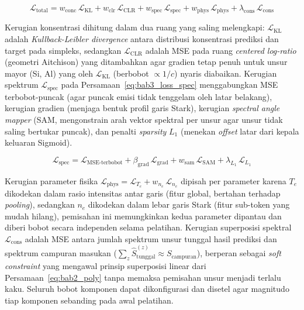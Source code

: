 \begin{enumerate}
\begin{equation} \label{eq:bab3_loss}
\mathcal{L}_{\mathrm{total}} = w_{\mathrm{conc}}\,\mathcal{L}_{\mathrm{KL}} + w_{\mathrm{clr}}\,\mathcal{L}_{\mathrm{CLR}} + w_{\mathrm{spec}}\,\mathcal{L}_{\mathrm{spec}} + w_{\mathrm{phys}}\,\mathcal{L}_{\mathrm{phys}} + \lambda_{\mathrm{cons}}\,\mathcal{L}_{\mathrm{cons}}
\end{equation}

    Kerugian konsentrasi dihitung dalam dua ruang yang saling melengkapi: $\mathcal{L}_{\mathrm{KL}}$ adalah \textit{Kullback-Leibler divergence} antara distribusi konsentrasi prediksi dan target pada simpleks, sedangkan $\mathcal{L}_{\mathrm{CLR}}$ adalah MSE pada ruang \textit{centered log-ratio} (geometri Aitchison) yang ditambahkan agar gradien tetap penuh untuk unsur mayor (Si, Al) yang oleh $\mathcal{L}_{\mathrm{KL}}$ (berbobot $\propto 1/c$) nyaris diabaikan. Kerugian spektrum $\mathcal{L}_{\mathrm{spec}}$ pada Persamaan~\ref{eq:bab3_loss_spec} menggabungkan MSE terbobot-puncak (agar puncak emisi tidak tenggelam oleh latar belakang), kerugian gradien (menjaga bentuk profil garis Stark), kerugian \textit{spectral angle mapper} (SAM, mengonstrain arah vektor spektral per unsur agar unsur tidak saling bertukar puncak), dan penalti \textit{sparsity} $L_1$ (menekan \textit{offset} latar dari kepala keluaran Sigmoid).

\begin{equation} \label{eq:bab3_loss_spec}
\mathcal{L}_{\mathrm{spec}} = \mathcal{L}_{\mathrm{MSE\text{-}terbobot}} + \beta_{\mathrm{grad}}\,\mathcal{L}_{\mathrm{grad}} + w_{\mathrm{sam}}\,\mathcal{L}_{\mathrm{SAM}} + \lambda_{L_1}\,\mathcal{L}_{L_1}
\end{equation}

    Kerugian parameter fisika $\mathcal{L}_{\mathrm{phys}} = \mathcal{L}_{T_e} + w_{n_e}\,\mathcal{L}_{n_e}$ dipisah per parameter karena $T_e$ dikodekan dalam rasio intensitas antar garis (fitur global, bertahan terhadap \textit{pooling}), sedangkan $n_e$ dikodekan dalam lebar garis Stark (fitur sub-token yang mudah hilang), pemisahan ini memungkinkan kedua parameter dipantau dan diberi bobot secara independen selama pelatihan. Kerugian superposisi spektral $\mathcal{L}_{\mathrm{cons}}$ adalah MSE antara jumlah spektrum unsur tunggal hasil prediksi dan spektrum campuran masukan ($\sum_z \hat{S}_{\mathrm{tunggal}}^{(z)} \approx S_{\mathrm{campuran}}$), berperan sebagai \textit{soft constraint} yang mengawal prinsip superposisi linear dari Persamaan~\ref{eq:bab2_poly} tanpa memaksa pemisahan unsur menjadi terlalu kaku. Seluruh bobot komponen dapat dikonfigurasi dan disetel agar magnitudo tiap komponen sebanding pada awal pelatihan.


\end{enumerate}
